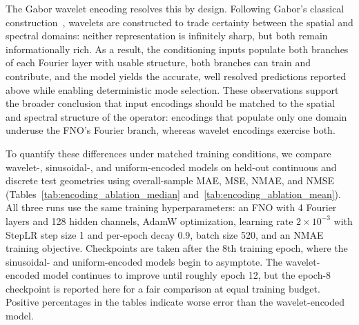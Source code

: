 \documentclass[preprint,review,12pt,numafflabel]{elsarticle}
\begin{document}
The Gabor wavelet encoding resolves this by design. Following Gabor's classical construction~\cite{gabor1946theory}, wavelets are constructed to trade certainty between the spatial and spectral domains: neither representation is infinitely sharp, but both remain informationally rich. As a result, the conditioning inputs populate both branches of each Fourier layer with usable structure, both branches can train and contribute, and the model yields the accurate, well resolved predictions reported above while enabling deterministic mode selection. These observations support the broader conclusion that input encodings should be matched to the spatial and spectral structure of the operator: encodings that populate only one domain underuse the FNO's Fourier branch, whereas wavelet encodings exercise both.

To quantify these differences under matched training conditions, we compare wavelet-, sinusoidal-, and uniform-encoded models on held-out continuous and discrete test geometries using overall-sample MAE, MSE, NMAE, and NMSE (Tables~\ref{tab:encoding_ablation_median} and~\ref{tab:encoding_ablation_mean}). All three runs use the same training hyperparameters: an FNO with 4 Fourier layers and 128 hidden channels, AdamW optimization, learning rate $2\times10^{-3}$ with StepLR step size 1 and per-epoch decay $0.9$, batch size 520, and an NMAE training objective. Checkpoints are taken after the 8th training epoch, where the sinusoidal- and uniform-encoded models begin to asymptote. The wavelet-encoded model continues to improve until roughly epoch 12, but the epoch-8 checkpoint is reported here for a fair comparison at equal training budget. Positive percentages in the tables indicate worse error than the wavelet-encoded model.
\end{document}
